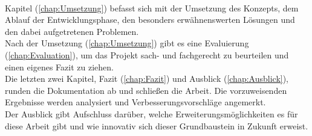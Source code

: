 \\ 
\linebreak
Kapitel (\ref{chap:Umsetzung}) befasst sich mit der Umsetzung des Konzepts, dem Ablauf der Entwicklungsphase, den besonders erwähnenswerten 
Lösungen und den dabei aufgetretenen Problemen.
\\ 
\linebreak
Nach der Umsetzung (\ref{chap:Umsetzung}) gibt es eine Evaluierung (\ref{chap:Evaluation}), um das Projekt sach- und fachgerecht zu beurteilen 
und einen eigenes Fazit zu ziehen.
\\ 
\linebreak 
Die letzten zwei Kapitel, Fazit (\ref{chap:Fazit}) und Ausblick (\ref{chap:Ausblick}), runden die Dokumentation ab und schließen die 
Arbeit. Die vorzuweisenden Ergebnisse werden analysiert und Verbesserungsvorschläge angemerkt.
\\ 
Der Ausblick gibt Aufschluss darüber, welche Erweiterungsmöglichkeiten es für diese Arbeit gibt und wie innovativ sich dieser 
Grundbaustein in Zukunft erweist. 
\pagebreak

